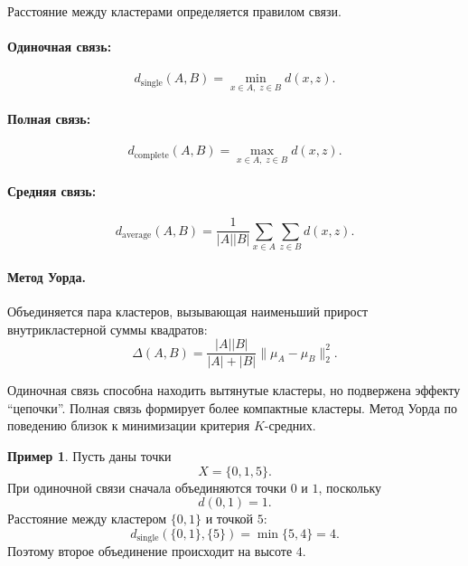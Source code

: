 \documentclass[12pt,a4paper]{article}
\theoremstyle{definition}
\newtheorem{example}[theorem]{Пример}
\theoremstyle{remark}
\begin{document}
Расстояние между кластерами определяется правилом связи.

\paragraph{Одиночная связь:}
\[
    d_{\mathrm{single}}(A,B)
    =
    \min_{x\in A,\;z\in B}d(x,z).
\]

\paragraph{Полная связь:}
\[
    d_{\mathrm{complete}}(A,B)
    =
    \max_{x\in A,\;z\in B}d(x,z).
\]

\paragraph{Средняя связь:}
\[
    d_{\mathrm{average}}(A,B)
    =
    \frac{1}{|A||B|}
    \sum_{x\in A}
    \sum_{z\in B}
    d(x,z).
\]

\paragraph{Метод Уорда.}
Объединяется пара кластеров, вызывающая наименьший прирост внутрикластерной
суммы квадратов:
\[
    \Delta(A,B)
    =
    \frac{|A||B|}{|A|+|B|}
    \|\mu_A-\mu_B\|_2^2.
\]

Одиночная связь способна находить вытянутые кластеры, но подвержена эффекту
``цепочки''. Полная связь формирует более компактные кластеры. Метод Уорда
по поведению близок к минимизации критерия $K$-средних.

\begin{example}
Пусть даны точки
\[
    X=\{0,1,5\}.
\]
При одиночной связи сначала объединяются точки $0$ и $1$, поскольку
\[
    d(0,1)=1.
\]
Расстояние между кластером $\{0,1\}$ и точкой $5$:
\[
    d_{\mathrm{single}}(\{0,1\},\{5\})
    =
    \min\{5,4\}
    =
    4.
\]
Поэтому второе объединение происходит на высоте $4$.

\begin{center}
\end{center}
\end{example}
\end{document}
